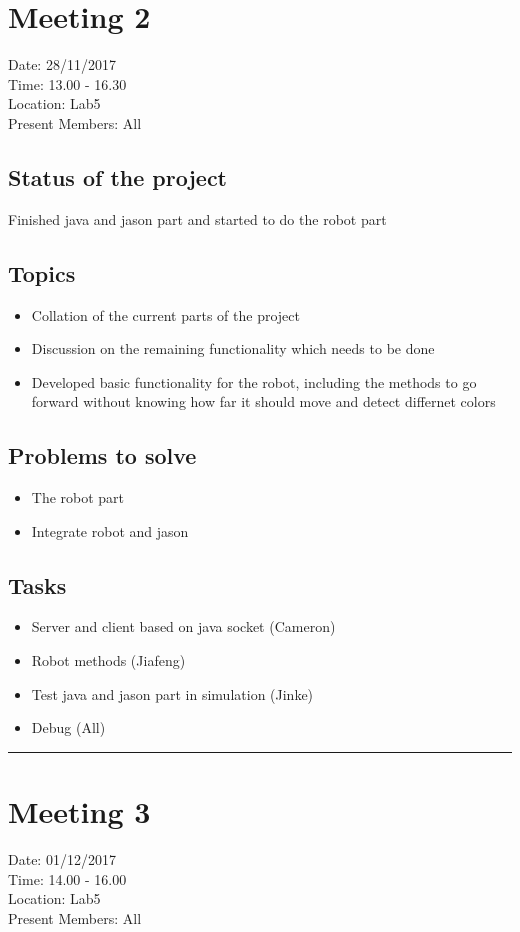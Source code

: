 \documentclass[a4paper, 12pt]{article}
\begin{document}
\section*{Meeting 2}
Date: 28/11/2017 \\
Time: 13.00 - 16.30 \\
Location: Lab5 \\
Present Members: All

\subsection*{Status of the project}
Finished java and jason part and started to do the robot part

\subsection*{Topics}
\begin{itemize}
\item Collation of the current parts of the project
\item Discussion on the remaining functionality which needs to be done
\item Developed basic functionality for the robot, including the methods to go forward without knowing how far it should move and detect differnet colors
\end{itemize}
\subsection*{Problems to solve}
\begin{itemize}
\item The robot part
\item Integrate robot and jason
\end{itemize}
\subsection*{Tasks}
\begin{itemize}
\item Server and client based on java socket (Cameron)
\item Robot methods (Jiafeng)
\item Test java and jason part in simulation (Jinke)
\item Debug (All)
\end{itemize}

\noindent\rule{\textwidth}{1pt}

\section*{Meeting 3}
Date: 01/12/2017 \\
Time: 14.00 - 16.00 \\
Location: Lab5 \\
Present Members: All
\end{document}
